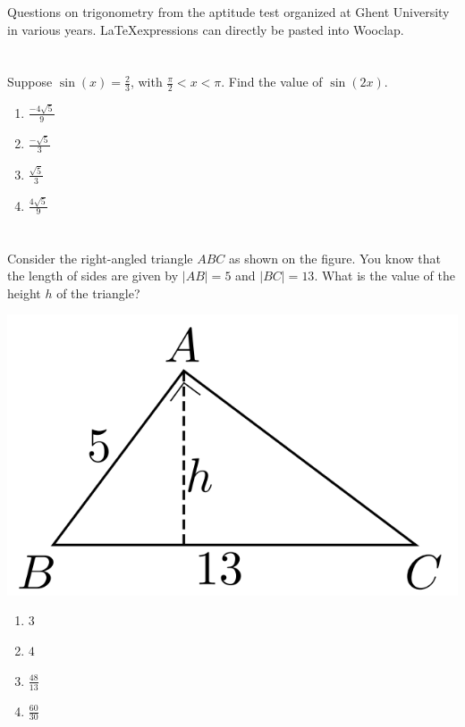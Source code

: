 \documentclass{article}
\begin{document}
Questions on trigonometry from the aptitude test organized at Ghent University in various years. \LaTeX expressions can directly be pasted into Wooclap.

\section{}

Suppose $\displaystyle\sin(x) = \frac{2}{3}$, with $\frac{\pi}{2} < x < \pi$. Find the value of $\sin(2x)$.

\begin{enumerate}
\item $\displaystyle\frac{-4\sqrt{5}}{9}$ %
\item $\displaystyle\frac{-\sqrt{5}}{3}$
\item $\displaystyle\frac{\sqrt{5}}{3}$
\item $\displaystyle\frac{4\sqrt{5}}{9}$
\end{enumerate}

\section{}
Consider the right-angled triangle $ABC$ as shown on the figure. You know that the length of sides are given by $|AB| = 5$ and $|BC| = 13$. What is the value of the height $h$ of the triangle?

\includegraphics{./images/triangle.png}

\begin{enumerate}
\item $3$
\item $4$
\item $\displaystyle\frac{48}{13}$
\item $\displaystyle\frac{60}{30}$ %
\end{enumerate}
\end{document}
